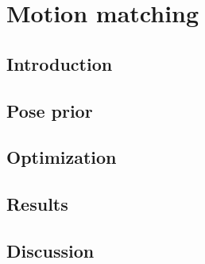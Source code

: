 \documentclass[../../main.tex]{subfiles}
\begin{document}
\chapter{Motion matching}

\section{Introduction}

\section{Pose prior}

\section{Optimization}

\section{Results}

\section{Discussion}
\end{document}
